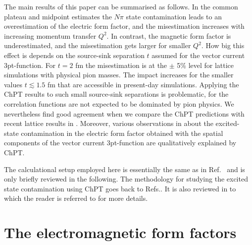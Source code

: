 \documentclass[11pt,prd,aps,showpacs,eqsecnum,floatfix,nofootinbib,preprint,tightenlines]{revtex4}
\begin{document}
The main results of this paper can be summarised as follows. In the common plateau and midpoint estimates the $N\pi$ state contamination leads to an overestimation of the electric form factor, and the misestimation increases with increasing momentum transfer $Q^2$. In contrast, the magnetic form factor is underestimated, and the misestimation gets larger for smaller $Q^2$.
How big this effect is depends on the source-sink separation $t$ assumed for the vector current 3pt-function. For $t=2$ fm the misestimation is at the $\pm$ 5\% level for lattice simulations with physical pion masses. 
The impact increases for the smaller values $t\lesssim 1.5$ fm that are accessible in present-day simulations. Applying the ChPT results to such small source-sink separations is problematic, for the correlation functions are not expected to be dominated by pion physics. We nevertheless find good agreement when we compare the ChPT predictions with recent lattice results in \cite{Ishikawa:2018rew,Alexandrou:2018sjm}. Moreover, various observations in \cite{Jang:2019jkn} about the excited-state contamination in the electric form factor obtained with the spatial components of the vector current 3pt-function are qualitatively explained by ChPT.

The calculational setup employed here is essentially the same as in Ref.\ \cite{Bar:2018xyi,Bar:2016uoj,Bar:2016jof} and is only briefly reviewed in the following. The methodology for studying the excited state contamination using ChPT goes back to  Refs.\cite{Tiburzi:2009zp,Bar:2012ce}. It is also reviewed in \cite{Bar:2017kxh,Bar:2017gqh} to which the reader is referred to for more details.

\section{The electromagnetic form factors}\label{sec:ff} 
\end{document}

